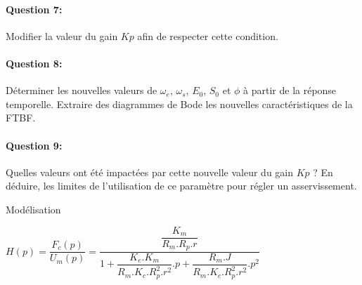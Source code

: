 \paragraph{Question 7:} Modifier la valeur du gain $Kp$ afin de respecter cette condition.

\paragraph{Question 8:} Déterminer les nouvelles valeurs de $\omega_e$, $\omega_s$, $E_0$, $S_0$ et $\phi$ à partir de la réponse temporelle. Extraire des diagrammes de Bode les nouvelles caractéristiques de la FTBF.

\paragraph{Question 9:} Quelles valeurs ont été impactées par cette nouvelle valeur du gain $Kp$ ? En déduire, les limites de l'utilisation de ce paramètre pour régler un asservissement.

\ifdef{\public}{}{}

\newpage

\pagestyle{correction}\setcounter{section}{0}

Modélisation
\begin{center}
$H(p)=\dfrac{F_c(p)}{U_m(p)}=\dfrac{\dfrac{K_m}{R_m.R_p.r}}{1+\dfrac{K_e.K_m}{R_m.K_c.R_p^2.r^2}.p+\dfrac{R_m.J}{R_m.K_c.R_p^2.r^2}.p^2}$
\end{center}

